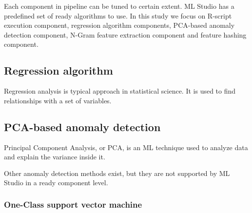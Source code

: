 Each component in pipeline can be tuned
to certain extent.
ML Studio has a predefined set of ready algorithms to use.
In this study we focus on  %
R-script execution component,
regression algorithm components,
PCA-based anomaly detection component,
N-Gram feature extraction component and
feature hashing component.



\subsection{Regression algorithm}\label{subsec:bg-regression-ml}
Regression analysis is typical approach in statistical science.
It is used to find relationships with a set of variables.


\subsection{PCA-based anomaly detection}\label{subsec:bg-pca-ada}



Principal Component Analysis, or PCA,
is an ML technique used to analyze data and explain the variance inside it.

Other anomaly detection methods exist, but they are not supported by ML Studio
in a ready component level. %


\subsubsection*{One-Class support vector machine}

